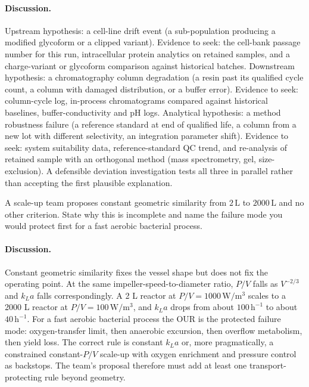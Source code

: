 \paragraph{Discussion.}
Upstream hypothesis: a cell-line drift event (a sub-population
producing a modified glycoform or a clipped variant). Evidence to
seek: the cell-bank passage number for this run, intracellular protein
analytics on retained samples, and a charge-variant or glycoform
comparison against historical batches. Downstream hypothesis: a
chromatography column degradation (a resin past its qualified cycle
count, a column with damaged distribution, or a buffer error). Evidence
to seek: column-cycle log, in-process chromatograms compared against
historical baselines, buffer-conductivity and pH logs. Analytical
hypothesis: a method robustness failure (a reference standard at end
of qualified life, a column from a new lot with different
selectivity, an integration parameter shift). Evidence to seek: system
suitability data, reference-standard QC trend, and re-analysis of
retained sample with an orthogonal method (mass spectrometry, gel,
size-exclusion). A defensible deviation investigation tests all three
in parallel rather than accepting the first plausible explanation.

\begin{exercise}
A scale-up team proposes constant geometric similarity from
$2\,\text{L}$ to $2000\,\text{L}$ and no other criterion. State why
this is incomplete and name the failure mode you would protect first
for a fast aerobic bacterial process.
\end{exercise}

\paragraph{Discussion.}
Constant geometric similarity fixes the vessel shape but does not
fix the operating point. At the same impeller-speed-to-diameter ratio,
$P/V$ falls as $V^{-2/3}$ and $k_L a$ falls correspondingly. A
2 L reactor at $P/V = 1000\,\text{W}/\text{m}^3$ scales to a 2000 L
reactor at $P/V = 100\,\text{W}/\text{m}^3$, and $k_L a$ drops from
about $100\,\text{h}^{-1}$ to about $40\,\text{h}^{-1}$. For a fast
aerobic bacterial process the OUR is the protected failure mode:
oxygen-transfer limit, then anaerobic excursion, then overflow
metabolism, then yield loss. The correct rule is constant $k_L a$
or, more pragmatically, a constrained constant-$P/V$ scale-up with
oxygen enrichment and pressure control as backstops. The team's
proposal therefore must add at least one transport-protecting rule
beyond geometry.

